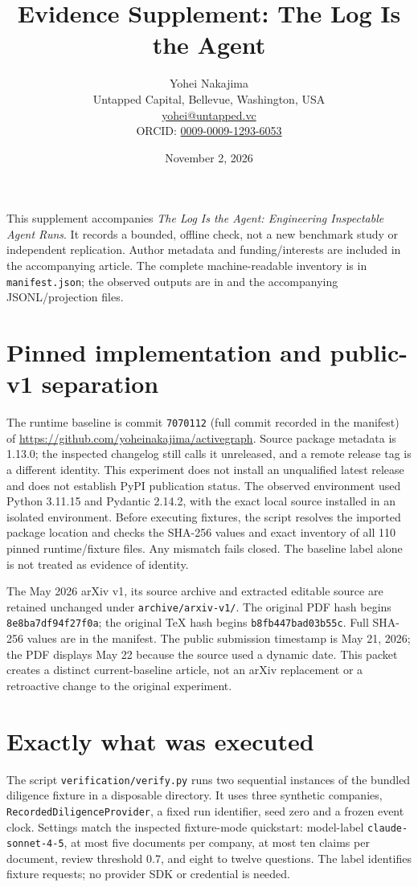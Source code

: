 \documentclass[11pt]{article}
\title{Evidence Supplement: The Log Is the Agent}
\author{Yohei Nakajima\\\small Untapped Capital, Bellevue, Washington, USA\\\small \href{mailto:yohei@untapped.vc}{yohei@untapped.vc}\\\small ORCID: \href{https://orcid.org/0009-0009-1293-6053}{0009-0009-1293-6053}}
\date{November 2, 2026}
\begin{document}
\maketitle
This supplement accompanies \emph{The Log Is the Agent: Engineering Inspectable Agent Runs}. It records a bounded, offline check, not a new benchmark study or independent replication. Author metadata and funding/interests are included in the accompanying article. The complete machine-readable inventory is in \texttt{manifest.json}; the observed outputs are in  and the accompanying JSONL/projection files.

\section*{Pinned implementation and public-v1 separation}
The runtime baseline is commit \texttt{7070112} (full commit recorded in the manifest) of \url{https://github.com/yoheinakajima/activegraph}. Source package metadata is 1.13.0; the inspected changelog still calls it unreleased, and a remote release tag is a different identity. This experiment does not install an unqualified latest release and does not establish PyPI publication status. The observed environment used Python 3.11.15 and Pydantic 2.14.2, with the exact local source installed in an isolated environment. Before executing fixtures, the script resolves the imported package location and checks the SHA-256 values and exact inventory of all 110 pinned runtime/fixture files. Any mismatch fails closed. The baseline label alone is not treated as evidence of identity.

The May 2026 arXiv v1, its source archive and extracted editable source are retained unchanged under \texttt{archive/arxiv-v1/}. The original PDF hash begins \texttt{8e8ba7df94f27f0a}; the original TeX hash begins \texttt{b8fb447bad03b55c}. Full SHA-256 values are in the manifest. The public submission timestamp is May 21, 2026; the PDF displays May 22 because the source used a dynamic date. This packet creates a distinct current-baseline article, not an arXiv replacement or a retroactive change to the original experiment.

\section*{Exactly what was executed}
The script \texttt{verification/verify.py} runs two sequential instances of the bundled diligence fixture in a disposable directory. It uses three synthetic companies, \texttt{RecordedDiligenceProvider}, a fixed run identifier, seed zero and a frozen event clock. Settings match the inspected fixture-mode quickstart: model-label \texttt{claude-sonnet-4-5}, at most five documents per company, at most ten claims per document, review threshold 0.7, and eight to twelve questions. The label identifies fixture requests; no provider SDK or credential is needed.
\end{document}
